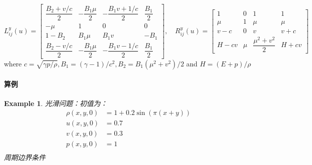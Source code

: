 \documentclass{article}
\newtheorem{example}{Example}
\numberwithin{equation}{subsection}    %
\begin{document}
\begin{appendix}
    \begin{equation}
        L_{i j}^{y}(u)=\begin{bmatrix}
            \dfrac{B_{2}+v / c}{2} & -\dfrac{B_{1} \mu}{2} & -\dfrac{B_{1} v+1 / c}{2} & \dfrac{B_{1}}{2} \\
            -\mu                   & 1                     & 0                         & 0                \\
            1-B_{2}                & B_{1} \mu             & B_{1} v                   & -B_{1}           \\
            \dfrac{B_{2}-v / c}{2} & -\dfrac{B_{1} \mu}{2} & -\dfrac{B_{1} v-1 / c}{2} & \dfrac{B_{1}}{2}
        \end{bmatrix},\quad
        R_{i j}^{y}(u)=\begin{bmatrix}
            1     & 0   & 1                        & 1     \\
            \mu   & 1   & \mu                      & \mu   \\
            v-c   & 0   & v                        & v+c   \\
            H-c v & \mu & \dfrac{\mu^{2}+v^{2}}{2} & H+c v
        \end{bmatrix}
    \end{equation}
    where  $c=\sqrt{\gamma p / \rho}, B_{1}=(\gamma-1) / c^{2}, B_{2}=B_{1}\left(\mu^{2}+v^{2}\right) / 2$  and  $H=(E+p) / \rho$
    \paragraph{算例}
    \begin{example}
        光滑问题：初值为：
        \begin{equation}
            \begin{aligned}
                \rho(x,y,0) & = 1+0.2\sin(\pi(x+y)) \\
                u(x,y,0)    & = 0.7                 \\
                v(x,y,0)    & = 0.3                 \\
                p(x,y,0)    & = 1                   \\
            \end{aligned}
        \end{equation}
        周期边界条件


\end{example}
\end{appendix}
\end{document}
